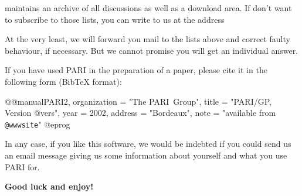 \centerline{\wwwsite}

\noindent maintains an archive of all discussions as well as a download area.
If don't want to subscribe to those lists, you can write to us at the address

\centerline{}

\noindent At the very least, we will forward you mail to the lists above and
correct faulty behaviour, if necessary. But we cannot promise you will get an
individual answer.

If you have used PARI in the preparation of a paper, please cite it in the
following form (BibTeX format):

\def\@{@}
\bprog
@@manual{PARI2,
    organization = "{The PARI~Group}",
    title        = "{PARI/GP, Version @vers}",
    year         = 2002,
    address      = "Bordeaux",
    note         = "available from {\tt @wwwsite}"
}
@eprog
\smallskip

\noindent In any case, if you like this software, we would be indebted if you
could send us an email message giving us some information about yourself and
what you use PARI for.

\medskip
{\bf Good luck and enjoy!}
\vfill\eject
